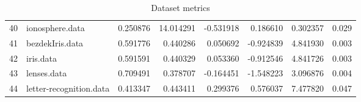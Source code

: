\begin{table}
{\begin{tabular}{llrrrrrr}
40 &                          ionosphere.data &       0.250876 &              14.014291 &  -0.531918 &    0.186610 &  0.302357 &        0.029 \\
41 &                          bezdekIris.data &       0.591776 &               0.440286 &   0.050692 &   -0.924839 &  4.841930 &        0.003 \\
42 &                                iris.data &       0.591591 &               0.440329 &   0.053360 &   -0.912546 &  4.841726 &        0.003 \\
43 &                              lenses.data &       0.709491 &               0.378707 &  -0.164451 &   -1.548223 &  3.096876 &        0.004 \\
44 &                  letter-recognition.data &       0.413347 &               0.443411 &   0.299376 &    0.576037 &  7.477820 &        0.047 \\
\bottomrule
\end{tabular}}
\caption{Dataset metrics}
\end{table}
